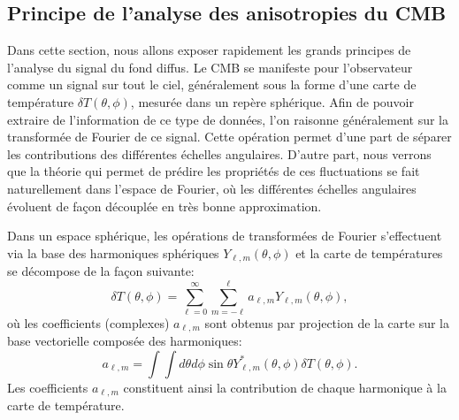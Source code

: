 \subsection{Principe de l'analyse des anisotropies du CMB}
Dans cette section, nous allons exposer rapidement les grands principes de l'analyse du signal du fond diffus. Le CMB se manifeste pour l'observateur comme un signal sur tout le ciel, généralement sous la forme d'une carte de température $\delta T(\theta,\phi)$, mesurée dans un repère sphérique. Afin de pouvoir extraire de l'information de ce type de données, l'on raisonne généralement sur la transformée de Fourier de ce signal. Cette opération permet d'une part de séparer les contributions des différentes échelles angulaires. D'autre part, nous verrons que la théorie qui permet de prédire les propriétés de ces fluctuations se fait naturellement dans l'espace de Fourier, où les différentes échelles angulaires évoluent de façon découplée en très bonne approximation.  

Dans un espace sphérique, les opérations de transformées de Fourier s'effectuent via la base des harmoniques sphériques $Y_{\ell,m}(\theta,\phi)$ et la carte de températures se décompose de la façon suivante:
\begin{equation}
\delta T(\theta,\phi)= \sum_{\ell=0}^{\infty}\sum_{m=-\ell}^{\ell} a_{\ell,m} Y_{\ell,m}(\theta,\phi),
\end{equation}
où les coefficients (complexes) $a_{\ell,m}$ sont obtenus par projection de la carte sur la base vectorielle composée des harmoniques:
\begin{equation}
a_{\ell,m}=\int \int d\theta d\phi\sin \theta Y^*_{\ell,m}(\theta,\phi) \delta T(\theta,\phi).
\end{equation}
Les coefficients $a_{\ell,m}$ constituent ainsi la contribution de chaque harmonique à la carte de température.

